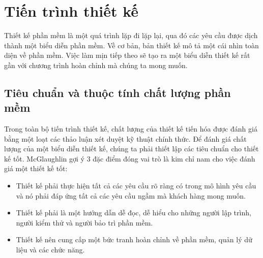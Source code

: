 \documentclass[./../SoftwareEngineering.tex]{subfiles}
\begin{document}
	\section{Tiến trình thiết kế}
	Thiết kế phần mềm là một quá trình lặp đi lặp lại, qua đó các yêu cầu được dịch thành một biểu diễn phần mềm. Về cơ bản, bản thiết kế mô tả một cái nhìn toàn diện về phần mềm. Việc làm mịn tiếp theo sẽ tạo ra một biểu diễn thiết kế rất gần với chương trình hoàn chỉnh mà chúng ta mong muốn.
	
	
	\subsection{Tiêu chuẩn và thuộc tính chất lượng phần mềm}
	Trong toàn bộ tiến trình thiết kế, chất lượng của thiết kế tiến hóa được đánh giá bằng một loạt các thảo luận xét duyệt kỹ thuật chính thức. Để đánh giá chất lượng của một biểu diễn thiết kế, chúng ta phải thiết lập các tiêu chuẩn cho thiết kế tốt. McGlaughlin \cite{McG91} gợi ý 3 đặc điểm đóng vai trò là kim chỉ nam cho việc đánh giá một thiết kế tốt:
	
	\begin{itemize}
		\item Thiết kế phải thực hiện tất cả các yêu cầu rõ ràng có trong mô hình yêu cầu và nó phải đáp ứng tất cả các yêu cầu ngầm mà khách hàng mong muốn.
		\item Thiết kế phải là một hướng dẫn dễ đọc, dễ hiểu cho những người lập trình, người kiểm thử và người bảo trì phần mềm.
		\item Thiết kế nên cung cấp một bức tranh hoàn chỉnh về phần mềm, quản lý dữ liệu và các chức năng.
	\end{itemize}
\end{document}
